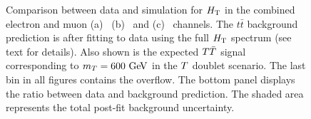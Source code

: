 \begin{figure}[htb]\begin{center}
	\caption{Comparison between data and simulation for $\HT$ in the combined
electron and muon (a) \chii\ (b) \chiii\ and (c) \chiv\ channels.
The $t\bar{t}$ background prediction is after fitting to data using the full $\HT$ spectrum (see text for details).
Also shown is the expected $\TT$ signal corresponding to $m_{\T}=600\gev$ in the $\T$ doublet scenario.
The last bin in all figures contains the overflow. The bottom panel displays the ratio between data
and background prediction. The shaded area represents the total post-fit background uncertainty.
\label{fig:HT_SignalRegion}}
\end{center}\end{figure}


